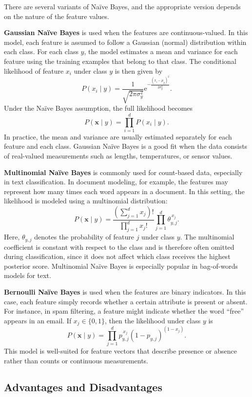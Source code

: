 \documentclass{article}
\begin{document}
There are several variants of Na\"ive Bayes, and the appropriate version depends on the nature of the feature values.

\textbf{Gaussian Na\"ive Bayes} is used when the features are continuous-valued. In this model, each feature is assumed to follow a Gaussian (normal) distribution within each class. For each class \(y\), the model estimates a mean and variance for each feature using the training examples that belong to that class. The conditional likelihood of feature \(x_i\) under class \(y\) is then given by
\[
P(x_i \mid y) =
\frac{1}{\sqrt{2\pi\sigma_y^2}}
\mathrm{e}^{-\frac{(x_i - \mu_y)^2}{2\sigma_y^2}}.
\]
Under the Na\"ive Bayes assumption, the full likelihood becomes
\[
P(\mathbf{x} \mid y) = \prod_{i=1}^{d} P(x_i \mid y).
\]
In practice, the mean and variance are usually estimated separately for each feature and each class. Gaussian Na\"ive Bayes is a good fit when the data consists of real-valued measurements such as lengths, temperatures, or sensor values.

\textbf{Multinomial Na\"ive Bayes} is commonly used for count-based data, especially in text classification. In document modeling, for example, the features may represent how many times each word appears in a document. In this setting, the likelihood is modeled using a multinomial distribution:
\[
P(\mathbf{x} \mid y)=
\frac{\left(\sum_{j=1}^d x_j\right)!}{\prod_{j=1}^d x_j!}
\prod_{j=1}^d \theta_{y,j}^{\,x_j}.
\]
Here, \(\theta_{y,j}\) denotes the probability of feature \(j\) under class \(y\). The multinomial coefficient is constant with respect to the class and is therefore often omitted during classification, since it does not affect which class receives the highest posterior score. Multinomial Na\"ive Bayes is especially popular in bag-of-words models for text.

\textbf{Bernoulli Na\"ive Bayes} is used when the features are binary indicators. In this case, each feature simply records whether a certain attribute is present or absent. For instance, in spam filtering, a feature might indicate whether the word ``free'' appears in an email. If \(x_j \in \{0,1\}\), then the likelihood under class \(y\) is
\[
P(\mathbf{x} \mid y)=\prod_{j=1}^d p_{y,j}^{\,x_j}(1-p_{y,j})^{(1-x_j)}.
\]
This model is well-suited for feature vectors that describe presence or absence rather than counts or continuous measurements.

\subsection{Advantages and Disadvantages}
\end{document}

